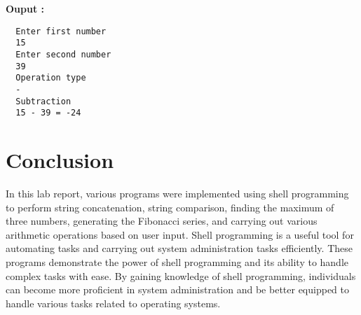 \documentclass[journal,onecolumn]{IEEEtran}
\begin{document}
\textbf{Ouput : }
\begin{verbatim}
  Enter first number
  15
  Enter second number
  39
  Operation type
  -
  Subtraction
  15 - 39 = -24
\end{verbatim}


\section{Conclusion}
In this lab report, various programs were implemented using shell programming to perform string concatenation, string comparison, finding the maximum of three numbers, generating the Fibonacci series, and carrying out various arithmetic operations based on user input. Shell programming is a useful tool for automating tasks and carrying out system administration tasks efficiently. These programs demonstrate the power of shell programming and its ability to handle complex tasks with ease. By gaining knowledge of shell programming, individuals can become more proficient in system administration and be better equipped to handle various tasks related to operating systems.
\end{document}
